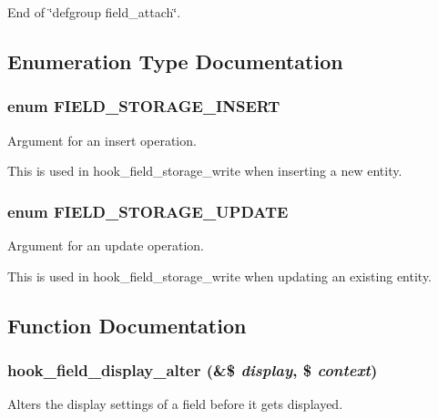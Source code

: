 End of \char`\"{}defgroup field\_\-attach\char`\"{}. 

\subsection{Enumeration Type Documentation}
\hypertarget{group__field__storage_ga111f1bae2368f363e9d68469e8a11fdf}{
\subsubsection[{FIELD\_\-STORAGE\_\-INSERT}]{\setlength{\rightskip}{0pt plus 5cm}enum {\bf FIELD\_\-STORAGE\_\-INSERT}}}
\label{group__field__storage_ga111f1bae2368f363e9d68469e8a11fdf}
Argument for an insert operation.

This is used in hook\_\-field\_\-storage\_\-write when inserting a new entity. \hypertarget{group__field__storage_ga45ab1b1aff3e5823611963cca1565954}{
\subsubsection[{FIELD\_\-STORAGE\_\-UPDATE}]{\setlength{\rightskip}{0pt plus 5cm}enum {\bf FIELD\_\-STORAGE\_\-UPDATE}}}
\label{group__field__storage_ga45ab1b1aff3e5823611963cca1565954}
Argument for an update operation.

This is used in hook\_\-field\_\-storage\_\-write when updating an existing entity. 

\subsection{Function Documentation}
\hypertarget{group__field__storage_ga7a5d4e018902a0072d5de819bbc7c409}{
\subsubsection[{hook\_\-field\_\-display\_\-alter}]{\setlength{\rightskip}{0pt plus 5cm}hook\_\-field\_\-display\_\-alter (\&\$ {\em display}, \/  \$ {\em context})}}
\label{group__field__storage_ga7a5d4e018902a0072d5de819bbc7c409}
Alters the display settings of a field before it gets displayed.

